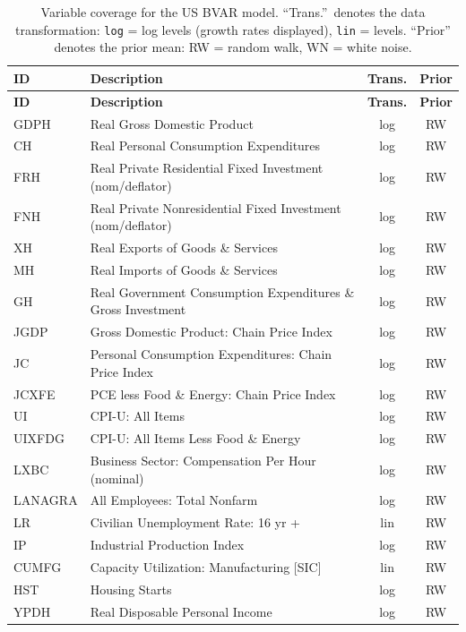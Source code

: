 \documentclass[11pt]{article}
\theoremstyle{definition}
\theoremstyle{remark}
\begin{document}
\begin{longtable}{lp{6.5cm}cc}
\caption{Variable coverage for the US BVAR model.  ``Trans.''\ denotes
the data transformation: \texttt{log} = log levels (growth rates
displayed), \texttt{lin} = levels.  ``Prior'' denotes the prior mean:
RW = random walk, WN = white noise.}\label{tab:vars} \\
\toprule
\textbf{ID} & \textbf{Description} & \textbf{Trans.} & \textbf{Prior} \\
\midrule
\endfirsthead
\toprule
\textbf{ID} & \textbf{Description} & \textbf{Trans.} & \textbf{Prior} \\
\midrule
\endhead
\bottomrule
\endfoot
GDPH      & Real Gross Domestic Product & log & RW \\
CH        & Real Personal Consumption Expenditures & log & RW \\
FRH       & Real Private Residential Fixed Investment (nom/deflator) & log & RW \\
FNH       & Real Private Nonresidential Fixed Investment (nom/deflator) & log & RW \\
XH        & Real Exports of Goods \& Services & log & RW \\
MH        & Real Imports of Goods \& Services & log & RW \\
GH        & Real Government Consumption Expenditures \& Gross Investment & log & RW \\
JGDP      & Gross Domestic Product: Chain Price Index & log & RW \\
JC        & Personal Consumption Expenditures: Chain Price Index & log & RW \\
JCXFE     & PCE less Food \& Energy: Chain Price Index & log & RW \\
UI        & CPI-U: All Items & log & RW \\
UIXFDG    & CPI-U: All Items Less Food \& Energy & log & RW \\
LXBC      & Business Sector: Compensation Per Hour (nominal) & log & RW \\
LANAGRA   & All Employees: Total Nonfarm & log & RW \\
LR        & Civilian Unemployment Rate: 16 yr + & lin & RW \\
IP        & Industrial Production Index & log & RW \\
CUMFG     & Capacity Utilization: Manufacturing [SIC] & lin & RW \\
HST       & Housing Starts & log & RW \\
YPDH      & Real Disposable Personal Income & log & RW \\

\end{longtable}
\end{document}
